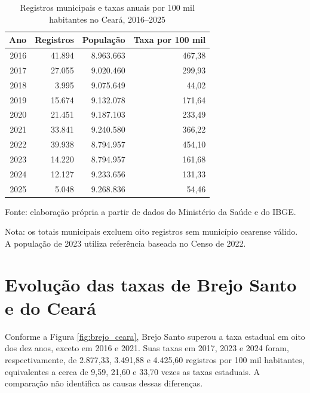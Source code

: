 \begin{table}[!htbp]
    \centering
    \caption{Registros municipais e taxas anuais por 100 mil habitantes no Ceará, 2016--2025}
    \label{tab:taxas_estaduais}
    \small
    \begin{tabular}{rrrr}
        \toprule
        Ano & Registros & População & Taxa por 100 mil \\
        \midrule
        2016 & 41.894 & 8.963.663 & 467,38 \\
        2017 & 27.055 & 9.020.460 & 299,93 \\
        2018 & 3.995 & 9.075.649 & 44,02 \\
        2019 & 15.674 & 9.132.078 & 171,64 \\
        2020 & 21.451 & 9.187.103 & 233,49 \\
        2021 & 33.841 & 9.240.580 & 366,22 \\
        2022 & 39.938 & 8.794.957 & 454,10 \\
        2023 & 14.220 & 8.794.957 & 161,68 \\
        2024 & 12.127 & 9.233.656 & 131,33 \\
        2025 & 5.048 & 9.268.836 & 54,46 \\
        \bottomrule
    \end{tabular}

    \vspace{0.2cm}
    \begin{minipage}{\textwidth}
        \footnotesize
        Fonte: elaboração própria a partir de dados do Ministério da Saúde e do IBGE.

        Nota: os totais municipais excluem oito registros sem município cearense válido. A população de 2023 utiliza referência baseada no Censo de 2022.
    \end{minipage}
\end{table}
\FloatBarrier

\section{Evolução das taxas de Brejo Santo e do Ceará}
\label{sec:brejo_ceara}

Conforme a Figura \ref{fig:brejo_ceara}, Brejo Santo superou a taxa estadual em oito dos dez anos, exceto em 2016 e 2021. Suas taxas em 2017, 2023 e 2024 foram, respectivamente, de 2.877,33, 3.491,88 e 4.425,60 registros por 100 mil habitantes, equivalentes a cerca de 9,59, 21,60 e 33,70 vezes as taxas estaduais. A comparação não identifica as causas dessas diferenças.

